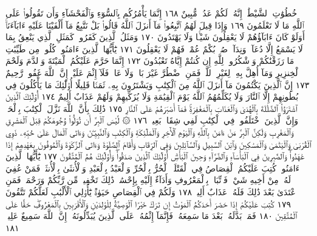 خُطُوَٰتِ ٱلشَّيْطَٰنِۚ إِنَّهُۥ لَكُمْ عَدُوࣱّ مُّبِينٌ ١٦٨ إِنَّمَا يَأْمُرُكُم
بِٱلسُّوٓءِ وَٱلْفَحْشَآءِ وَأَن تَقُولُوا۟ عَلَى ٱللَّهِ مَا لَا تَعْلَمُونَ ١٦٩
وَإِذَا قِيلَ لَهُمُ ٱتَّبِعُوا۟ مَآ أَنزَلَ ٱللَّهُ قَالُوا۟ بَلْ نَتَّبِعُ مَآ أَلْفَيْنَا
عَلَيْهِ ءَابَآءَنَآۚ أَوَلَوْ كَانَ ءَابَآؤُهُمْ لَا يَعْقِلُونَ شَيْـࣰٔا وَلَا
يَهْتَدُونَ ١٧٠ وَمَثَلُ ٱلَّذِينَ كَفَرُوا۟ كَمَثَلِ ٱلَّذِي يَنْعِقُ
بِمَا لَا يَسْمَعُ إِلَّا دُعَآءࣰ وَنِدَآءࣰۚ صُمُّۢ بُكْمٌ عُمْيࣱ فَهُمْ لَا يَعْقِلُونَ ١٧١
يَٰٓأَيُّهَا ٱلَّذِينَ ءَامَنُوا۟ كُلُوا۟ مِن طَيِّبَٰتِ مَا رَزَقْنَٰكُمْ
وَٱشْكُرُوا۟ لِلَّهِ إِن كُنتُمْ إِيَّاهُ تَعْبُدُونَ ١٧٢ إِنَّمَا حَرَّمَ
عَلَيْكُمُ ٱلْمَيْتَةَ وَٱلدَّمَ وَلَحْمَ ٱلْخِنزِيرِ وَمَآ أُهِلَّ بِهِۦ لِغَيْرِ
ٱللَّهِۖ فَمَنِ ٱضْطُرَّ غَيْرَ بَاغࣲ وَلَا عَادࣲ فَلَآ إِثْمَ عَلَيْهِۚ إِنَّ ٱللَّهَ
غَفُورࣱ رَّحِيمٌ ١٧٣ إِنَّ ٱلَّذِينَ يَكْتُمُونَ مَآ أَنزَلَ ٱللَّهُ مِنَ
ٱلْكِتَٰبِ وَيَشْتَرُونَ بِهِۦ ثَمَنࣰا قَلِيلًا أُو۟لَٰٓئِكَ مَا يَأْكُلُونَ
فِي بُطُونِهِمْ إِلَّا ٱلنَّارَ وَلَا يُكَلِّمُهُمُ ٱللَّهُ يَوْمَ ٱلْقِيَٰمَةِ
وَلَا يُزَكِّيهِمْ وَلَهُمْ عَذَابٌ أَلِيمٌ ١٧٤ أُو۟لَٰٓئِكَ ٱلَّذِينَ
ٱشْتَرَوُا۟ ٱلضَّلَٰلَةَ بِٱلْهُدَىٰ وَٱلْعَذَابَ بِٱلْمَغْفِرَةِۚ فَمَآ
أَصْبَرَهُمْ عَلَى ٱلنَّارِ ١٧٥ ذَٰلِكَ بِأَنَّ ٱللَّهَ نَزَّلَ ٱلْكِتَٰبَ بِٱلْحَقِّۗ
وَإِنَّ ٱلَّذِينَ ٱخْتَلَفُوا۟ فِي ٱلْكِتَٰبِ لَفِي شِقَاقِۭ بَعِيدࣲ ١٧٦
۞ لَّيْسَ ٱلْبِرَّ أَن تُوَلُّوا۟ وُجُوهَكُمْ قِبَلَ ٱلْمَشْرِقِ وَٱلْمَغْرِبِ
وَلَٰكِنَّ ٱلْبِرَّ مَنْ ءَامَنَ بِٱللَّهِ وَٱلْيَوْمِ ٱلْأٓخِرِ وَٱلْمَلَٰٓئِكَةِ
وَٱلْكِتَٰبِ وَٱلنَّبِيِّـۧنَ وَءَاتَى ٱلْمَالَ عَلَىٰ حُبِّهِۦ ذَوِي ٱلْقُرْبَىٰ وَٱلْيَتَٰمَىٰ
وَٱلْمَسَٰكِينَ وَٱبْنَ ٱلسَّبِيلِ وَٱلسَّآئِلِينَ وَفِي ٱلرِّقَابِ وَأَقَامَ
ٱلصَّلَوٰةَ وَءَاتَى ٱلزَّكَوٰةَ وَٱلْمُوفُونَ بِعَهْدِهِمْ إِذَا عَٰهَدُوا۟ۖ
وَٱلصَّٰبِرِينَ فِي ٱلْبَأْسَآءِ وَٱلضَّرَّآءِ وَحِينَ ٱلْبَأْسِۗ أُو۟لَٰٓئِكَ ٱلَّذِينَ
صَدَقُوا۟ۖ وَأُو۟لَٰٓئِكَ هُمُ ٱلْمُتَّقُونَ ١٧٧ يَٰٓأَيُّهَا ٱلَّذِينَ ءَامَنُوا۟ كُتِبَ
عَلَيْكُمُ ٱلْقِصَاصُ فِي ٱلْقَتْلَىۖ ٱلْحُرُّ بِٱلْحُرِّ وَٱلْعَبْدُ بِٱلْعَبْدِ وَٱلْأُنثَىٰ
بِٱلْأُنثَىٰۚ فَمَنْ عُفِيَ لَهُۥ مِنْ أَخِيهِ شَيْءࣱ فَٱتِّبَاعُۢ بِٱلْمَعْرُوفِ وَأَدَآءٌ
إِلَيْهِ بِإِحْسَٰنࣲۗ ذَٰلِكَ تَخْفِيفࣱ مِّن رَّبِّكُمْ وَرَحْمَةࣱۗ فَمَنِ ٱعْتَدَىٰ
بَعْدَ ذَٰلِكَ فَلَهُۥ عَذَابٌ أَلِيمࣱ ١٧٨ وَلَكُمْ فِي ٱلْقِصَاصِ حَيَوٰةࣱ يَٰٓأُو۟لِي
ٱلْأَلْبَٰبِ لَعَلَّكُمْ تَتَّقُونَ ١٧٩ كُتِبَ عَلَيْكُمْ إِذَا حَضَرَ
أَحَدَكُمُ ٱلْمَوْتُ إِن تَرَكَ خَيْرًا ٱلْوَصِيَّةُ لِلْوَٰلِدَيْنِ وَٱلْأَقْرَبِينَ
بِٱلْمَعْرُوفِۖ حَقًّا عَلَى ٱلْمُتَّقِينَ ١٨٠ فَمَنۢ بَدَّلَهُۥ بَعْدَ مَا سَمِعَهُۥ
فَإِنَّمَآ إِثْمُهُۥ عَلَى ٱلَّذِينَ يُبَدِّلُونَهُۥٓۚ إِنَّ ٱللَّهَ سَمِيعٌ عَلِيمࣱ ١٨١
